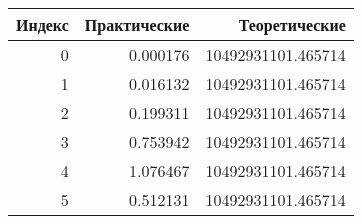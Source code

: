 \begin{tabular}{rrr}
\toprule
Индекс & Практические & Теоретические \\
\midrule
0 & 0.000176 & 10492931101.465714 \\
1 & 0.016132 & 10492931101.465714 \\
2 & 0.199311 & 10492931101.465714 \\
3 & 0.753942 & 10492931101.465714 \\
4 & 1.076467 & 10492931101.465714 \\
5 & 0.512131 & 10492931101.465714 \\
\bottomrule
\end{tabular}
